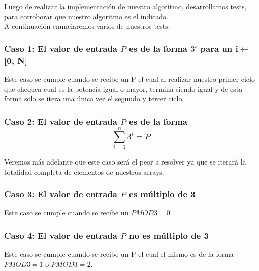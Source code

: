 \indent Luego de realizar la implementaci\'on de nuestro algoritmo, desarrollamos tests,
para corroborar que nuestro algoritmo es el indicado.\\

A continuaci\'on enunciaremos varios de nuestros tests:\\

\begin{center}
  \subsubsection*{Caso 1: El valor de entrada $P$ es de la forma ${3^i}$ para un i$\gets$[0, N] }
\end{center}
 Este caso se cumple cuando se recibe un P el cual al realizar nuestro primer ciclo que chequea cual es la potencia igual o mayor, termina siendo igual y de esta forma solo se itera una \'unica vez el segundo y tercer ciclo.
 
\begin{center}
  \subsubsection*{Caso 2: El valor de entrada $P$ es de la forma \[
\sum_{i=1}^{n}3^{i}=P 
\]}
\end{center}

Veremos m\'as adelante que este caso ser\'a el peor a resolver ya que se iterar\'a la totalidad completa de elementos de nuestros arrays.

\begin{center}
 \subsubsection*{Caso 3: El valor de entrada $P$ es m\'ultiplo de 3}
\end{center}

 Este caso se cumple cuando se recibe un $P MOD 3 = 0$.

\begin{center}
 \subsubsection*{Caso 4: El valor de entrada $P$ no es m\'ultiplo de 3}
\end{center}

 Este caso se cumple cuando se recibe un P el cual el mismo es de la forma $P MOD 3 = 1$ o $P MOD 3 = 2$.
 